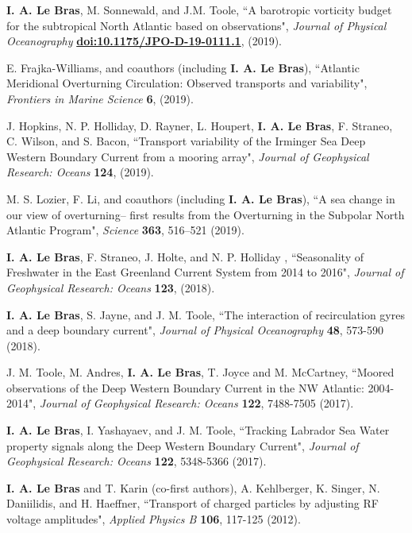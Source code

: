 \documentclass[paper=letter,fontsize=11pt]{scrartcl} %
\newcommand{\PaperEntry}[6]{
		\noindent #1, ``#2", \textit{#3} \textbf{#4}, #5 (#6).}
\begin{document}
\begin{etaremune}
\item \PaperEntry{\textbf{I. A. Le Bras}, M. Sonnewald, and J.M. Toole}{A barotropic vorticity budget for the subtropical North Atlantic based on observations}{Journal of Physical Oceanography}{\url{doi:10.1175/JPO-D-19-0111.1}}{}{2019}

\item \PaperEntry{E. Frajka-Williams, and coauthors (including \textbf{I. A. Le Bras})}{Atlantic Meridional Overturning Circulation: Observed transports and variability}{Frontiers in Marine Science}{6}{}{2019}

\item \PaperEntry{J. Hopkins, N. P. Holliday, D. Rayner, L. Houpert, \textbf{I. A. Le Bras}, F. Straneo, C. Wilson, and S. Bacon}{Transport variability of the Irminger Sea Deep Western Boundary Current from a mooring array}{Journal of Geophysical Research: Oceans}{124}{}{2019}

\item \PaperEntry{M. S. Lozier, F.  Li, and coauthors (including \textbf{I. A. Le Bras})}{A sea change in our view of overturning– first results from the
Overturning in the Subpolar North Atlantic Program}{Science}{363}{516--521}{2019}

\item \PaperEntry{\textbf{I. A. Le Bras}, F. Straneo, J. Holte, and N. P. Holliday }{Seasonality of Freshwater in the East Greenland Current
System from 2014 to 2016}{Journal of Geophysical Research: Oceans}{123}{}{2018}

\item \PaperEntry{\textbf{I. A. Le Bras}, S. Jayne, and J. M. Toole}{The interaction of recirculation gyres and a deep boundary current}{Journal of Physical Oceanography}{48}{573-590}{2018}
	
\item \PaperEntry{J. M. Toole, M. Andres, \textbf{I. A. Le Bras}, T. Joyce and M. McCartney}{Moored observations of the Deep Western Boundary Current in the NW Atlantic: 2004-2014}{ Journal of Geophysical Research: Oceans}{122}{7488-7505}{2017}

\item \PaperEntry{\textbf{I. A. Le Bras}, I. Yashayaev, and J. M. Toole}{Tracking Labrador Sea Water property signals along the Deep Western Boundary Current}{ Journal of Geophysical Research: Oceans}{122}{5348-5366}{2017}

\item \PaperEntry{\textbf{I. A. Le Bras} and T. Karin (co-first authors), A. Kehlberger, K. Singer, N. Daniilidis, and H. Haeffner}{Transport of charged particles by adjusting RF voltage amplitudes}{Applied Physics B}{106}{117-125}{2012}

\end{etaremune}
\end{document}
